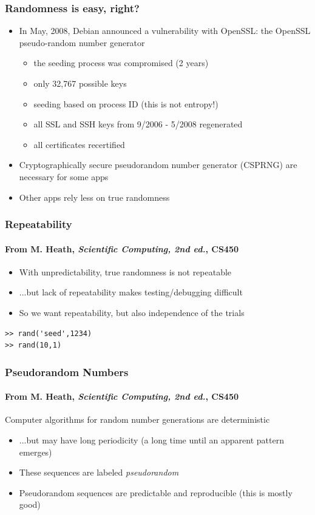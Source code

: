 \documentclass[10pt]{beamer}
\begin{document}
\begin{frame}
\frametitle{Randomness is easy, right?}
\begin{itemize}
\item 
In May, 2008, Debian announced a vulnerability with OpenSSL: the OpenSSL pseudo-random number generator
	\begin{itemize}
		\item the seeding process was compromised (2 years)
		\item only 32,767 possible keys
		\item seeding based on process ID (this is not entropy!)
		\item all SSL and SSH keys from 9/2006 - 5/2008 regenerated
		\item all certificates recertified
	\end{itemize}
	
\item Cryptographically secure pseudorandom number generator (CSPRNG) are necessary for some apps
\item Other apps rely less on true randomness
\end{itemize}
\end{frame}
\begin{frame}[fragile]
\frametitle{Repeatability}
\framesubtitle{From M. Heath, \emph{Scientific Computing, 2nd ed.}, CS450}
\begin{itemize}
    \item With unpredictability, true randomness is not repeatable
    \item ...but lack of repeatability makes testing/debugging difficult
    \item So we want repeatability, but also independence of the trials
\end{itemize}
\bigskip

\begin{lstlisting}
>> rand('seed',1234)  
>> rand(10,1)      
\end{lstlisting}

\end{frame}
\begin{frame}
\frametitle{Pseudorandom Numbers}
\framesubtitle{From M. Heath, \emph{Scientific Computing, 2nd ed.}, CS450}
\begin{alertblock}{}
    Computer algorithms for random number generations are deterministic
\end{alertblock}
\begin{itemize}
    \item ...but may have long periodicity (a long time until an apparent 
      pattern emerges)
    \item These sequences are labeled \emph{pseudorandom}
    \item Pseudorandom sequences are predictable and reproducible (this is
mostly good)
\end{itemize}
\end{frame}
\end{document}
